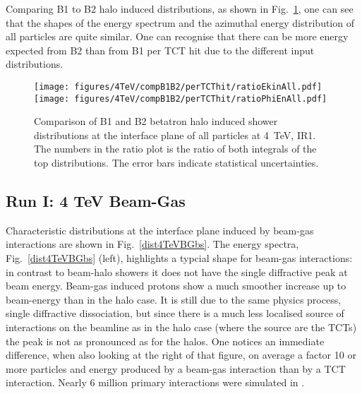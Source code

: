 Comparing B1 to B2 halo induced distributions, as shown in Fig.~\ref{fig:comp4TeVB1B2}, one can see that the shapes of the energy spectrum and the azimuthal energy distribution of all particles are quite similar. One can recognise that there can be more energy expected from B2 than from B1 per TCT hit due to the different input distributions.



\begin{figure}%
\begin{center}
\texttt{[image: figures/4TeV/compB1B2/perTCThit/ratioEkinAll.pdf]}
\texttt{[image: figures/4TeV/compB1B2/perTCThit/ratioPhiEnAll.pdf]}
\end{center}
\vspace{-0.6cm}
 \caption{Comparison of B1 and B2 betatron halo induced shower distributions at the interface plane of all particles at 4~TeV, IR1. The numbers in the ratio plot is the ratio of both integrals of the top distributions. The error bars indicate statistical uncertainties.
  \label{fig:comp4TeVB1B2}}
\end{figure}


\subsection{Run I: 4 TeV Beam-Gas}

Characteristic distributions at the interface plane induced by beam-gas interactions are shown in Fig.~\ref{dist4TeVBGbs}. The energy spectra, Fig.~\ref{dist4TeVBGbs} (left), highlights a typcial shape for beam-gas interactions: in contrast to beam-halo showers it does not have the single diffractive peak at beam energy. Beam-gas induced protons show a much smoother increase up to beam-energy than in the halo case. It is still due to the same physics process, single diffractive dissociation, but since there is a much less localised source of interactions on the beamline as in the halo case (where the source are the TCTs) the peak is not as pronounced as for the halos.
One notices an immediate difference, when also looking at the right of that figure, on average a factor 10 or more particles and energy produced by a beam-gas interaction than by a TCT interaction. Nearly 6 million primary interactions were simulated in \fluka.%



